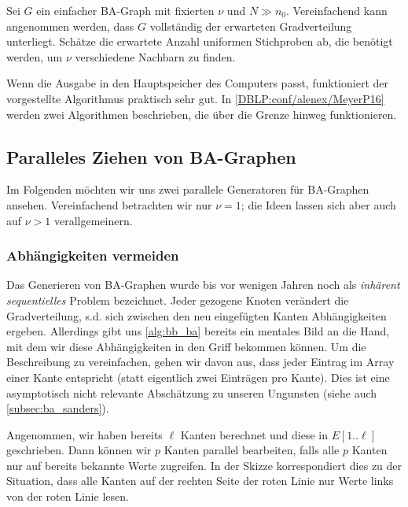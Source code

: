 \begin{exercise}
    Sei $G$ ein einfacher BA-Graph mit fixierten $\nu$ und $N \gg n_0$.
    Vereinfachend kann angenommen werden, dass $G$ vollständig der erwarteten Gradverteilung unterliegt.
    Schätze die erwartete Anzahl uniformen Stichproben ab, die benötigt werden, um $\nu$ verschiedene Nachbarn zu finden.
\end{exercise}

Wenn die Ausgabe in den Hauptspeicher des Computers passt, funktioniert der vorgestellte Algorithmus praktisch sehr gut.
In \cref{DBLP:conf/alenex/MeyerP16} werden zwei Algorithmen beschrieben, die über die Grenze hinweg funktionieren.

\subsection{Paralleles Ziehen von BA-Graphen}
Im Folgenden möchten wir uns zwei parallele Generatoren für BA-Graphen ansehen.
Vereinfachend betrachten wir nur $\nu = 1$; die Ideen lassen sich aber auch auf $\nu > 1$ verallgemeinern.

\subsubsection{Abhängigkeiten vermeiden}
Das Generieren von BA-Graphen wurde bis vor wenigen Jahren noch als \emph{inhärent sequentielles} Problem bezeichnet.
Jeder gezogene Knoten verändert die Gradverteilung, s.d. sich zwischen den neu eingefügten Kanten Abhängigkeiten ergeben.
Allerdings gibt uns \cref{alg:bb_ba} bereits ein mentales Bild an die Hand, mit dem wir diese Abhängigkeiten in den Griff bekommen können.
Um die Beschreibung zu vereinfachen, gehen wir davon aus, dass jeder Eintrag im Array einer Kante entspricht (statt eigentlich zwei Einträgen pro Kante).
Dies ist eine asymptotisch nicht relevante Abschätzung zu unseren Ungunsten (siehe auch \cref{subsec:ba_sanders}).

Angenommen, wir haben bereits $\ell$ Kanten berechnet und diese in $E[1..\ell]$ geschrieben.
Dann können wir $p$ Kanten parallel bearbeiten, falls alle $p$ Kanten nur auf bereits bekannte Werte zugreifen.
In der Skizze korrespondiert dies zu der Situation, dass alle Kanten auf der rechten Seite der roten Linie nur Werte links von der roten Linie lesen.

